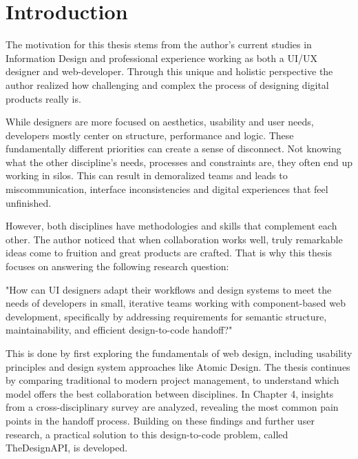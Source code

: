 \newpage
\section{Introduction}
The motivation for this thesis stems from the author's current studies in Information Design and
professional experience working as both a UI/UX designer and web-developer. Through this unique and
holistic perspective the author realized how challenging and complex the process of designing
digital products really is. 

While designers are more focused on aesthetics, usability and user needs, developers mostly center
on structure, performance and logic. These fundamentally different priorities can create a sense of
disconnect. Not knowing what the other discipline's needs, processes and constraints are, they often
end up working in silos. This can result in demoralized teams and leads to miscommunication,
interface inconsistencies and digital experiences that feel unfinished.

However, both disciplines have methodologies and skills that complement each other. The author
noticed that when collaboration works well, truly remarkable ideas come to fruition and great
products are crafted. That is why this thesis focuses on answering the following research question:

"How can UI designers adapt their workflows and design systems to meet the needs of developers in
small, iterative teams working with component-based web development, specifically by addressing
requirements for semantic structure, maintainability, and efficient design-to-code handoff?"

This is done by first exploring the fundamentals of web design, including usability principles and
design system approaches like Atomic Design. The thesis continues by comparing traditional to modern
project management, to understand which model offers the best collaboration between disciplines. In
Chapter 4, insights from a cross-disciplinary survey are analyzed, revealing the most common pain
points in the handoff process. Building on these findings and further user research, a practical
solution to this design-to-code problem, called TheDesignAPI, is developed. 
